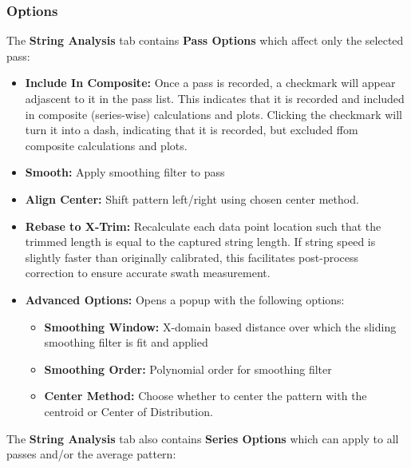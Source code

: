 \documentclass[10pt,letterpaper,titlepage]{article}
\begin{document}
    \subsubsection{Options}
    \label{sec:string_options}
    The \textbf{String Analysis} tab contains \textbf{Pass Options} which affect only the selected pass:
    \begin{itemize}
        \item \textbf{Include In Composite:} Once a pass is recorded, a checkmark will appear adjascent to it in the pass list. This indicates that it is recorded and included in composite (series-wise) calculations and plots. Clicking the checkmark will turn it into a dash, indicating that it is recorded, but excluded ffom composite calculations and plots.
        \item \textbf{Smooth:} Apply smoothing filter to pass
        \item \textbf{Align Center:} Shift pattern left/right using chosen center method.
        \item \textbf{Rebase to X-Trim:} Recalculate each data point location such that the trimmed length is equal to the captured string length. If string speed is slightly faster than originally calibrated, this facilitates post-process correction to ensure accurate swath measurement.
        \item \textbf{Advanced Options:} Opens a popup with the following options:
        \begin{itemize}
            \item \textbf{Smoothing Window:} X-domain based distance over which the sliding smoothing filter is fit and applied
            \item \textbf{Smoothing Order:} Polynomial order for smoothing filter
            \item \textbf{Center Method:} Choose whether to center the pattern with the centroid or Center of Distribution.
        \end{itemize}
    \end{itemize}
    The \textbf{String Analysis} tab also contains \textbf{Series Options} which can apply to all passes and/or the average pattern:
\end{document}
